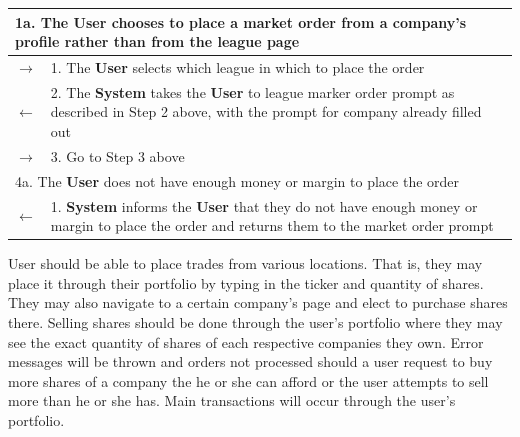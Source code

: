 \begin{centering}
\begin{longtable}{|p{1.2in} p{5in}|}
\multicolumn{2}{|p{6.2in}|}{1a. The \textbf{User} chooses to place a market order from a company's profile rather than from the league page} \\
\hline
$\rightarrow$ & 1. The \textbf{User} selects which league in which to place the order  \\
$\leftarrow$ & 2. The \textbf{System} takes the \textbf{User} to league marker order prompt as described in Step 2 above, with the prompt for company already filled out \\
$\rightarrow$ & 3. Go to Step 3 above \\
\hline
\multicolumn{2}{|p{6.2in}|}{4a. The \textbf{User} does not have enough money or margin to place the order} \\
\hline
$\leftarrow$ & 1. \textbf{System} informs the \textbf{User} that they do not have enough money or margin to place the order and returns them to the market order prompt \\
\hline 
\end{longtable}
\end{centering}

User should be able to place trades from various locations. That is, they may place it through
their portfolio by typing in the ticker and quantity of shares. They may also navigate to a
certain company’s page and elect to purchase shares there. Selling shares should be done
through the user’s portfolio where they may see the exact quantity of shares of each respective
companies they own. Error messages will be thrown and orders not processed should a user request
to buy more shares of a company the he or she can afford or the user attempts to sell more than
he or she has. Main transactions will occur through the user’s portfolio. \\ \\

